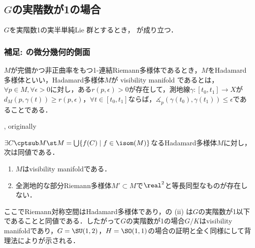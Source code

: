 \subsection{$ G$の実階数が1の場合}

\begin{thm}\label{thm:1216-main}
  $G$を実階数1の実半単純Lie 群とするとき， が成り立つ．
\end{thm}


\subsubsection{補足: の微分幾何的側面}
\begin{defi}{\cite[Definition~1.3]{e72-1}}\label{def:visibility}

  $M$が完備かつ非正曲率をもつ1-連結Riemann多様体であるとき，$M$をHadamard多様体といい，Hadamard多様体$M$が visibility manifold であるとは，$\forall p\in M, \forall \epsilon > 0$に対し，ある$r(p,\epsilon) >0 $が存在して，測地線$\gamma\colon [t_0, t_1]\to X $が$d_{M}(p, \gamma(t))\geq r(p,\epsilon) $，$\forall t\in [t_0, t_1]$ならば，$\measuredangle_{p}(\gamma(t_0), \gamma(t_1)) \leq \epsilon $であることである．
\end{defi}


\begin{thm}{\cite[p.~296, 9.33~Theorem]{bh99}, originally \cite[Theorem~4.1]{e72-2}}\label{thm:visibility-and-rank}
  
  $\exists C\cptsub M\st M = \bigcup\{f(C)\mid f\in \isom(M) \}  $なるHadamard多様体$M$に対し，次は同値である．
  \vspace{-1em}
  \begin{enumerate}
    \renewcommand{\labelenumi}{(\roman{enumi})}
  \item $M$はvisibility manifoldである．
  \item 全測地的な部分Riemann多様体$M'\subset M$で$\real^2$と等長同型なものが存在しない．
  \end{enumerate}
\end{thm}

ここでRiemann対称空間はHadamard多様体であり，の (ii) は$G$の実階数が1以下であることと同値である．したがって$G$の実階数が1の場合$G/K$はvisibility manifoldであり，$G = \SU(1,2) $，$H= \SO(1,1)$の場合の証明と全く同様にして背理法によりが示される．

